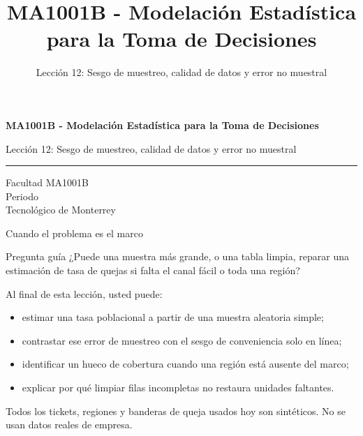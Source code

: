 \documentclass[aspectratio=169,10pt,spanish]{beamer}
\title{MA1001B - Modelación Estadística para la Toma de Decisiones}
\subtitle{Lección 12: Sesgo de muestreo, calidad de datos y error no muestral}
\author{}
\institute{Tecnol\'ogico de Monterrey}
\date{}
\begin{document}
\begin{frame}[plain]
  \vspace{1.2cm}
  {\Large\bfseries MA1001B - Modelación Estadística para la Toma de Decisiones\par}
  \vspace{0.7cm}
  {\large Lección 12: Sesgo de muestreo, calidad de datos y error no muestral\par}
  \vspace{0.7cm}
  {\color{TecRojo}\rule{\textwidth}{1.2pt}}
  \vspace{0.8cm}

  Facultad MA1001B\\[0.3cm]
  Periodo\\[0.3cm]
  Tecnol\'ogico de Monterrey
\end{frame}

\begin{frame}{Cuando el problema es el marco}
  \begin{alertblock}{Pregunta guía}
    ¿Puede una muestra más grande, o una tabla limpia, reparar una
    estimación de tasa de quejas si falta el canal fácil o toda una región?
  \end{alertblock}

  \vspace{0.6em}
  Al final de esta lección, usted puede:
  \begin{itemize}
    \item estimar una tasa poblacional a partir de una muestra aleatoria simple;
    \item contrastar ese error de muestreo con el sesgo de conveniencia solo en línea;
    \item identificar un hueco de cobertura cuando una región está ausente del marco;
    \item explicar por qué limpiar filas incompletas no restaura unidades faltantes.
  \end{itemize}

  \vfill
  \scriptsize Todos los tickets, regiones y banderas de queja usados hoy son sintéticos. No se usan datos reales de empresa.
\end{frame}
\end{document}

